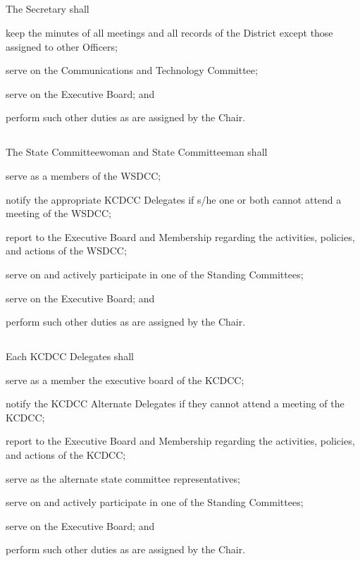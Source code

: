 \subsection{}
The Secretary shall
\begin{inlinealphalist}
    \item keep the minutes of all meetings and all records of the \fortythird{} District  except those assigned to other Officers;
    \item serve on the Communications and Technology Committee;
    \item serve on the Executive Board; and
    \item perform such other duties as are assigned by the Chair.
\end{inlinealphalist}

\subsection{}
The State Committeewoman and State Committeeman shall
\begin{inlinealphalist}
    \item serve as a members of the WSDCC;
    \item notify the appropriate KCDCC Delegates if s/he one or both cannot attend a meeting of the WSDCC;
    \item report to the Executive Board and Membership regarding the activities, policies, and actions of the WSDCC;
    \item serve on and actively participate in one of the Standing Committees;
    \item serve on the Executive Board; and
    \item perform such other duties as are assigned by the Chair.
\end{inlinealphalist}

\subsection{}
Each KCDCC Delegates shall
\begin{inlinealphalist}
    \item serve as a member the executive board of the KCDCC;
    \item notify the KCDCC Alternate Delegates if they cannot attend a meeting of the KCDCC;
    \item report to the Executive Board and Membership regarding the activities, policies, and actions of the KCDCC;
    \item serve as the alternate state committee representatives;
    \item serve on and actively participate in one of the Standing Committees;
    \item serve on the Executive Board; and
    \item perform such other duties as are assigned by the Chair.
\end{inlinealphalist}

